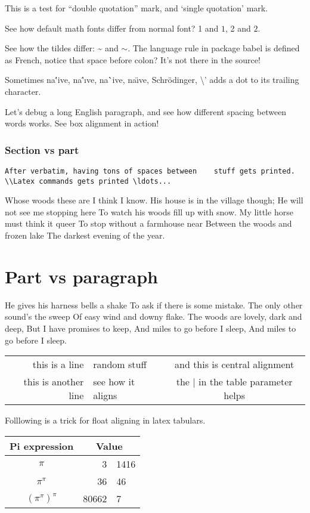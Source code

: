 \documentclass{article}
\begin{document}
\par
This is a test for ``double quotation'' mark, and `single quotation' mark.
\par
See how default math fonts differ from normal font? 1 and $1$, 2 and $2$.
\par
See how the tildes differ: \~{} and $\sim$. The language rule in package babel is defined as French, notice that space before colon? It's not there in the source!
\par
Sometimes na\''{i}ve, na\''\i ve, na\``ive, na\"\i ve, Schr\"odinger, \textbackslash' adds a dot to its trailing character.
\par
Let's debug a long English paragraph, and see how different spacing between words works. See box alignment in action!
\section{Section vs part}
\par
\begin{verbatim}
After verbatim, having tons of spaces between    stuff gets printed. \\Latex commands gets printed \ldots...
\end{verbatim}
\par
Whose woods these are I think I know.   
His house is in the village though; 
He will not see me stopping here   
To watch his woods fill up with snow.   
My little horse must think it queer   
To stop without a farmhouse near   
Between the woods and frozen lake   
The darkest evening of the year.   
\part{Part vs paragraph}
He gives his harness bells a shake   
To ask if there is some mistake.   
The only other sound's the sweep   
Of easy wind and downy flake.   
The woods are lovely, dark and deep,   
But I have promises to keep,   
And miles to go before I sleep,   
And miles to go before I sleep.

\begin{tabular}{|r|l|c|}
\hline
this is a line & random stuff & and this is central alignment\\
this is another line & see how it aligns & the | in the table parameter helps \\
\hline
\end{tabular}

\par
Folllowing is a trick for float aligning in latex tabulars.

\par
\begin{tabular}{c|r @{.} l}
Pi expression       &
\multicolumn{2}{c}{Value} \\
\hline
$\pi$               & 3&1416  \\
$\pi^{\pi}$         & 36&46   \\
$(\pi^{\pi})^{\pi}$ & 80662&7 \\
\end{tabular}
\end{document}
